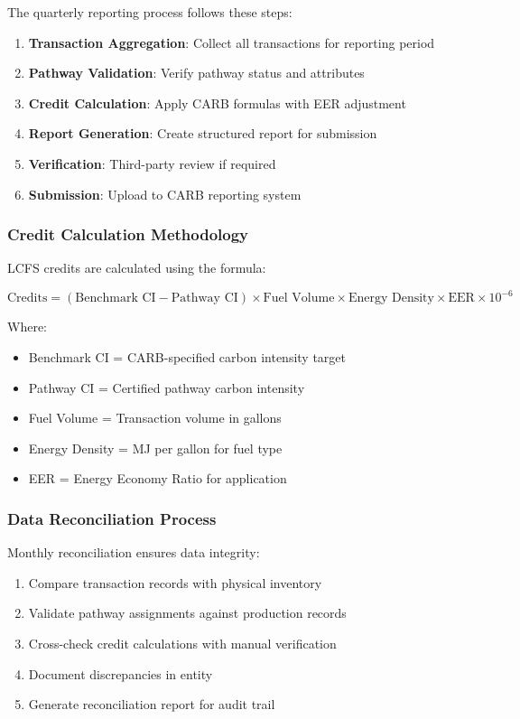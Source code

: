 The quarterly reporting process follows these steps:

\begin{enumerate}
    \item \textbf{Transaction Aggregation}: Collect all transactions for reporting period
    \item \textbf{Pathway Validation}: Verify pathway status and attributes
    \item \textbf{Credit Calculation}: Apply CARB formulas with EER adjustment
    \item \textbf{Report Generation}: Create structured report for submission
    \item \textbf{Verification}: Third-party review if required
    \item \textbf{Submission}: Upload to CARB reporting system
\end{enumerate}

\subsubsection{Credit Calculation Methodology}

LCFS credits are calculated using the formula:

\begin{equation}
\text{Credits} = (\text{Benchmark CI} - \text{Pathway CI}) \times \text{Fuel Volume} \times \text{Energy Density} \times \text{EER} \times 10^{-6}
\end{equation}

Where:
\begin{itemize}
    \item Benchmark CI = CARB-specified carbon intensity target
    \item Pathway CI = Certified pathway carbon intensity
    \item Fuel Volume = Transaction volume in gallons
    \item Energy Density = MJ per gallon for fuel type
    \item EER = Energy Economy Ratio for application
\end{itemize}

\subsubsection{Data Reconciliation Process}

Monthly reconciliation ensures data integrity:

\begin{enumerate}
    \item Compare transaction records with physical inventory
    \item Validate pathway assignments against production records
    \item Cross-check credit calculations with manual verification
    \item Document discrepancies in  entity
    \item Generate reconciliation report for audit trail
\end{enumerate}

